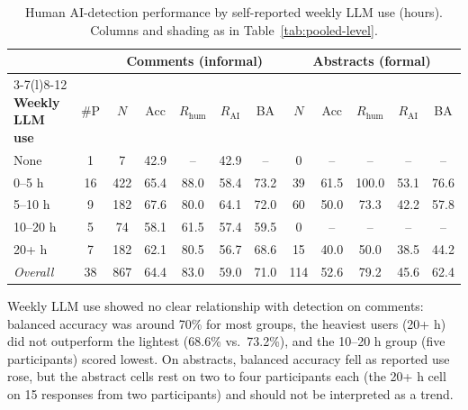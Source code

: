 \documentclass[thesis]{cluu}
\newcommand{\cg}[1]{\cellcolor{hmgreen!#1}}
\newcommand{\crd}[1]{\cellcolor{hmred!#1}}
\begin{document}
\begin{table}[H]
  \centering
  \small
  \setlength{\tabcolsep}{3pt}
  \renewcommand{\arraystretch}{1.15}
  \begin{tabular}{l c c cccc c cccc}
    \toprule
    & & \multicolumn{5}{c}{\textbf{Comments} (informal)}
        & \multicolumn{5}{c}{\textbf{Abstracts} (formal)} \\
    \cmidrule(lr){3-7}\cmidrule(l){8-12}
    \textbf{Weekly LLM use} & \#P
     & $N$ & Acc & $R_{\mathrm{hum}}$ & $R_{\mathrm{AI}}$ & BA
     & $N$ & Acc & $R_{\mathrm{hum}}$ & $R_{\mathrm{AI}}$ & BA \\
    \midrule
None & 1 & 7 & 42.9 & -- & 42.9 & -- & 0 & -- & -- & -- & -- \\
0--5 h & 16 & 422 & 65.4 & 88.0 & 58.4 & \cg{23}73.2 & 39 & 61.5 & 100.0 & 53.1 & \cg{27}76.6 \\
5--10 h & 9 & 182 & 67.6 & 80.0 & 64.1 & \cg{22}72.0 & 60 & 50.0 & 73.3 & 42.2 & \cg{8}57.8 \\
10--20 h & 5 & 74 & 58.1 & 61.5 & 57.4 & \cg{10}59.5 & 0 & -- & -- & -- & -- \\
20+ h & 7 & 182 & 62.1 & 80.5 & 56.7 & \cg{19}68.6 & 15 & 40.0 & 50.0 & 38.5 & \crd{6}44.2 \\
    \midrule
\textit{Overall} & 38 & 867 & 64.4 & 83.0 & 59.0 & \cg{21}71.0 & 114 & 52.6 & 79.2 & 45.6 & \cg{12}62.4 \\
    \bottomrule
  \end{tabular}
  \caption{Human AI-detection performance by self-reported weekly LLM use
  (hours). Columns and shading as in Table~\ref{tab:pooled-level}.}
  \label{tab:pooled-llm}
\end{table}

Weekly LLM use showed no clear relationship with detection on comments: balanced
accuracy was around 70\% for most groups, the heaviest users (20+ h) did not outperform
the lightest (68.6\% vs.\ 73.2\%), and the 10--20 h group (five participants) scored
lowest. On abstracts, balanced accuracy fell as reported use rose, but the abstract cells
rest on two to four participants each (the 20+ h cell on 15 responses from two
participants) and should not be interpreted as a trend.
\end{document}
